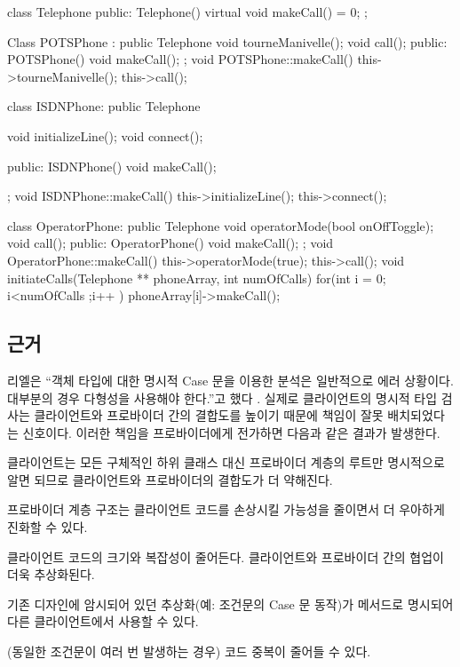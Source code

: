 \documentclass[a4paper,10pt,twoside]{book}
\begin{document}
\begin{code}
class Telephone {
public:
	Telephone() {}
	virtual void makeCall() = 0;
};

Class POTSPhone : public Telephone {
	void tourneManivelle();
	void call();
public: 
	POTSPhone() {}
	void makeCall();
};
void POTSPhone::makeCall() {
	this->tourneManivelle();
	this->call();
}

class ISDNPhone: public Telephone {
	void initializeLine();
	void connect();

public:
	ISDNPhone() { }
	void makeCall();
};
void ISDNPhone::makeCall() {
	this->initializeLine();
	this->connect();
}

class OperatorPhone: public Telephone {
	void operatorMode(bool onOffToggle);
	void call();
public: 
	OperatorPhone() { }
	void makeCall();
};
void OperatorPhone::makeCall() {
	this->operatorMode(true);
	this->call();
}
void initiateCalls(Telephone ** phoneArray, int numOfCalls) {
	for(int i = 0; i<numOfCalls ;i++ ) {
		phoneArray[i]->makeCall();
	}
}
\end{code}

\subsection*{근거}

리엘은 ``객체 타입에 대한 명시적 Case 문을 이용한 분석은 일반적으로 에러 상황이다. 대부분의 경우 다형성을 사용해야 한다.''고 했다 \cite{Riel96a}. 실제로 클라이언트의 명시적 타입 검사는 클라이언트와 프로바이더 간의 결합도를 높이기 때문에 책임이 잘못 배치되었다는 신호이다. 이러한 책임을 프로바이더에게 전가하면 다음과 같은 결과가 발생한다.

\begin{bulletlist}
\item 클라이언트는 모든 구체적인 하위 클래스 대신 프로바이더 계층의 루트만 명시적으로 알면 되므로 클라이언트와 프로바이더의 결합도가 더 약해진다.

\item 프로바이더 계층 구조는 클라이언트 코드를 손상시킬 가능성을 줄이면서 더 우아하게 진화할 수 있다.

\item 클라이언트 코드의 크기와 복잡성이 줄어든다. 클라이언트와 프로바이더 간의 협업이 더욱 추상화된다.

\item 기존 디자인에 암시되어 있던 추상화(예: 조건문의 Case 문 동작)가 메서드로 명시되어 다른 클라이언트에서 사용할 수 있다.

\item (동일한 조건문이 여러 번 발생하는 경우) 코드 중복이 줄어들 수 있다.
\end{bulletlist}
\end{document}
